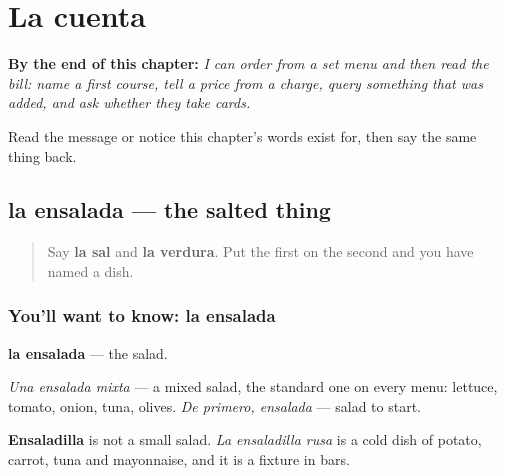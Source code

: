 
\chapter{La cuenta}
\label{ch:es-cuenta}

\begin{chapteropening}
\textbf{By the end of this chapter:} \emph{I can order from a set menu and then read the bill: name a first course, tell a price from a charge, query something that was added, and ask whether they take cards.}

Read the message or notice this chapter's words exist for, then say the same thing back.
\end{chapteropening}

\section[la ensalada]{la ensalada — the salted thing}

\label{lesson:ES-C456-ensalada}



\begin{quote}
Say \textbf{la sal} and \textbf{la verdura}. Put the first on the second and you have named a dish.
\end{quote}

\subsection*{You'll want to know: la ensalada}
\textbf{la ensalada} — the salad.

\emph{Una ensalada mixta} — a mixed salad, the standard one on every menu: lettuce, tomato, onion, tuna, olives. \emph{De primero, ensalada} — salad to start.

\textbf{Ensaladilla} is not a small salad. \emph{La ensaladilla rusa} is a cold dish of potato, carrot, tuna and mayonnaise, and it is a fixture in bars.


